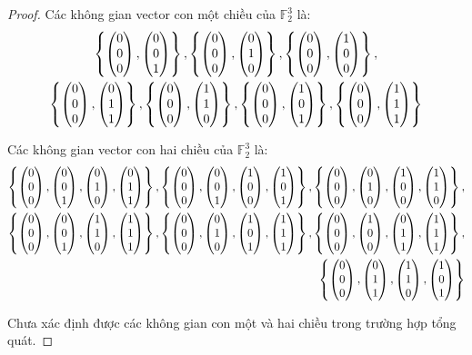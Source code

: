 \begin{proof}
    Các không gian vector con một chiều của $\mathbb{F}^{3}_{2}$ là:
    \begin{multline*}
        \left\{
        \begin{pmatrix} 0 \\ 0 \\ 0 \end{pmatrix},
        \begin{pmatrix} 0 \\ 0 \\ 1 \end{pmatrix}
        \right\},
        \left\{
        \begin{pmatrix} 0 \\ 0 \\ 0 \end{pmatrix},
        \begin{pmatrix} 0 \\ 1 \\ 0 \end{pmatrix}
        \right\},
        \left\{
        \begin{pmatrix} 0 \\ 0 \\ 0 \end{pmatrix},
        \begin{pmatrix} 1 \\ 0 \\ 0 \end{pmatrix}
        \right\}, \\
        \left\{
        \begin{pmatrix} 0 \\ 0 \\ 0 \end{pmatrix},
        \begin{pmatrix} 0 \\ 1 \\ 1 \end{pmatrix}
        \right\},
        \left\{
        \begin{pmatrix} 0 \\ 0 \\ 0 \end{pmatrix},
        \begin{pmatrix} 1 \\ 1 \\ 0 \end{pmatrix}
        \right\},
        \left\{
        \begin{pmatrix} 0 \\ 0 \\ 0 \end{pmatrix},
        \begin{pmatrix} 1 \\ 0 \\ 1 \end{pmatrix}
        \right\},
        \left\{
        \begin{pmatrix} 0 \\ 0 \\ 0 \end{pmatrix},
        \begin{pmatrix} 1 \\ 1 \\ 1 \end{pmatrix}
        \right\}
    \end{multline*}
        
    Các không gian vector con hai chiều của $\mathbb{F}^{3}_{2}$ là:
    \[
        \begin{split}
            \left\{
            \begin{pmatrix} 0 \\ 0 \\ 0 \end{pmatrix},
            \begin{pmatrix} 0 \\ 0 \\ 1 \end{pmatrix},
            \begin{pmatrix} 0 \\ 1 \\ 0 \end{pmatrix},
            \begin{pmatrix} 0 \\ 1 \\ 1 \end{pmatrix}
            \right\},
            \left\{
            \begin{pmatrix} 0 \\ 0 \\ 0 \end{pmatrix},
            \begin{pmatrix} 0 \\ 0 \\ 1 \end{pmatrix},
            \begin{pmatrix} 1 \\ 0 \\ 0 \end{pmatrix},
            \begin{pmatrix} 1 \\ 0 \\ 1 \end{pmatrix}
            \right\},
            \left\{
            \begin{pmatrix} 0 \\ 0 \\ 0 \end{pmatrix},
            \begin{pmatrix} 0 \\ 1 \\ 0 \end{pmatrix},
            \begin{pmatrix} 1 \\ 0 \\ 0 \end{pmatrix},
            \begin{pmatrix} 1 \\ 1 \\ 0 \end{pmatrix}
            \right\}, \\
            \left\{
            \begin{pmatrix} 0 \\ 0 \\ 0 \end{pmatrix},
            \begin{pmatrix} 0 \\ 0 \\ 1 \end{pmatrix},
            \begin{pmatrix} 1 \\ 1 \\ 0 \end{pmatrix},
            \begin{pmatrix} 1 \\ 1 \\ 1 \end{pmatrix}
            \right\},
            \left\{
            \begin{pmatrix} 0 \\ 0 \\ 0 \end{pmatrix},
            \begin{pmatrix} 0 \\ 1 \\ 0 \end{pmatrix},
            \begin{pmatrix} 1 \\ 0 \\ 1 \end{pmatrix},
            \begin{pmatrix} 1 \\ 1 \\ 1 \end{pmatrix}
            \right\},
            \left\{
            \begin{pmatrix} 0 \\ 0 \\ 0 \end{pmatrix},
            \begin{pmatrix} 1 \\ 0 \\ 0 \end{pmatrix},
            \begin{pmatrix} 0 \\ 1 \\ 1 \end{pmatrix},
            \begin{pmatrix} 1 \\ 1 \\ 1 \end{pmatrix}
            \right\}, \\
            \left\{
            \begin{pmatrix} 0 \\ 0 \\ 0 \end{pmatrix},
            \begin{pmatrix} 0 \\ 1 \\ 1 \end{pmatrix},
            \begin{pmatrix} 1 \\ 1 \\ 0 \end{pmatrix},
            \begin{pmatrix} 1 \\ 0 \\ 1 \end{pmatrix}
            \right\}
        \end{split}
    \]

    Chưa xác định được các không gian con một và hai chiều trong trường hợp tổng quát.
\end{proof}

